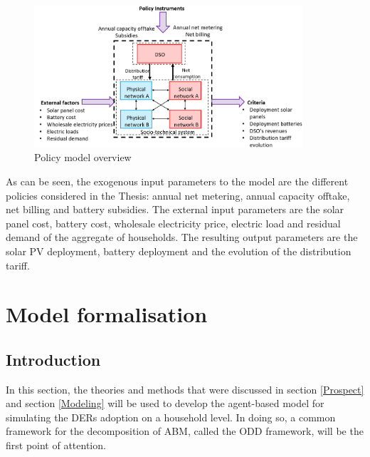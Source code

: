 \begin{figure}[h!]
\centering
\includegraphics[width=10cm]{model3.PNG}
\caption{Policy model overview}
\label{Figure:model3}
\end{figure}
As can be seen, the exogenous input parameters to the model are the different policies considered in the Thesis: annual net metering, annual capacity offtake, net billing and battery subsidies. The external input parameters are the solar panel cost, battery cost, wholesale electricity price, electric load and residual demand of the aggregate of households. The resulting output parameters are the solar PV deployment, battery deployment and the evolution of the distribution tariff.  
\section{Model formalisation} \label{formalisation}
\subsection{Introduction}
In this section, the theories and methods that were discussed in section \ref{Prospect} and section \ref{Modeling} will be used to develop the agent-based model for simulating the DERs adoption on a household level. In doing so, a common framework for the decomposition of ABM, called the ODD framework, will be the first point of attention.
